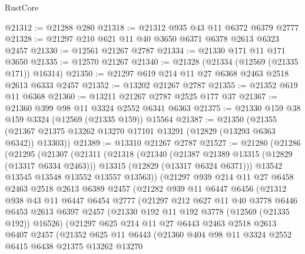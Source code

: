 \begin{lexlean}{RustCore}
\begin{coremodule}
@21312 := @21288 @280
@21318 := @21312 @935 @43 @11 @6372 @6379 @2777
@21328 := @21297 @210 @621 @11 @40 @3650 @6371 @6378 @2613 @6323 @2457
@21330 := @12561 @21267 @2787
@21334 := @21330 @171 @11 @171 @3650
@21335 := @12570 @21267
@21340 := @21328 (@21334 (@12569 (@21335 @171)) @16314)
@21350 := @21297 @619 @214 @11 @27 @6368 @2463 @2518 @2613 @6333 @2457
@21352 := @13202 @21267 @2787
@21355 := @21352 @619 @11 @6368
@21360 := @13211 @21267 @2787 @2525 @177 @37
@21367 := @21360 @399 @98 @11 @3324 @2552 @6341 @6363
@21375 := @21330 @159 @38 @159 @3324 (@12569 (@21335 @159)) @15564
@21387 := @21350
    (@21355 (@21367 @21375 @13262 @13270 @17101 @13291 (@12829 (@13293 @6363 @6342)) @13303))
@21389 := @13310 @21267 @2787
@21527 := @21280
    (@21286
      (@21295
        (@21307
          (@21311
            (@21318
              (@21340
                (@21387 @21389 @13315 (@12829 (@13317 @6334 @2463)))
                @13315
                (@12829 (@13317 @6324 @6371)))
              @13542
              @13545
              @13548
              @13552
              @13557
              @13563))
          (@21297
            @939
            @214
            @11
            @27
            @6458
            @2463
            @2518
            @2613
            @6389
            @2457
            (@21282
              @939
              @11
              @6447
              @6456
              (@21312
                @938
                @43
                @11
                @6447
                @6454
                @2777
                (@21297
                  @212
                  @627
                  @11
                  @40
                  @3778
                  @6446
                  @6453
                  @2613
                  @6397
                  @2457
                  (@21330 @192 @11 @192 @3778 (@12569 (@21335 @192)) @16526)
                  (@21297
                    @625
                    @214
                    @11
                    @27
                    @6443
                    @2463
                    @2518
                    @2613
                    @6407
                    @2457
                    (@21352
                      @625
                      @11
                      @6443
                      (@21360
                        @404
                        @98
                        @11
                        @3324
                        @2552
                        @6415
                        @6438
                        @21375
                        @13262
                        @13270

\end{coremodule}
\end{lexlean}
